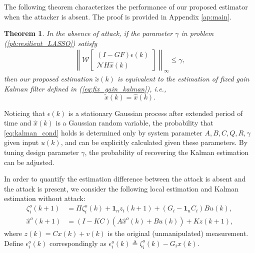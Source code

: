 \documentclass[12pt]{article}  %
\newcommand{\Nc}{{\mathcal{N}}}
\newcommand{\Wc}{{\mathcal{W}}}
\newcommand{\ift}{{\infty}}
\newtheorem{theorem}{\textbf{Theorem}}
\begin{document}
The following theorem characterizes the performance of our proposed estimator when the attacker is absent. 
The proof is provided in Appendix \ref{ap:main}.
\begin{theorem}\label{th:no_attack}
	In the absence of attack, if the parameter $\gamma$ in problem (\ref{pb:resilient_LASSO}) satisfy
	\begin{align}\label{eq:kalman_cond}
	\left\|\Wc \begin{bmatrix}
	\left(I-GF\right)\epsilon(k) \\
	\Nc H \hat{x}(k)
	\end{bmatrix}\right\|_\ift\leq\gamma, 
	\end{align}
	then our proposed estimation $\tilde{x}(k)$ is equivalent to the estimation of fixed gain Kalman filter defined in (\ref{eq:fix_gain_kalman}), i.e.,
	\begin{equation}\label{eq:eq_to_kalman}
	\tilde{x}(k)=\hat{x}(k).
	\end{equation}
\end{theorem}
Noticing that $\epsilon(k)$ is a stationary Gaussian process after extended period of time and $\hat{x}(k)$ is a Gaussian random variable, the probability that \eqref{eq:kalman_cond} holds is determined only by system parameter $A,B,C,Q,R,\gamma$ given input $u(k)$, and can be explicitly calculated given these parameters.
By tuning design parameter $\gamma$, the probability of recovering the Kalman estimation can be adjusted.

	

In order to quantify the estimation difference between the attack is absent and the attack is present, we consider the following local estimation and Kalman estimation without attack:
\begin{align}
\zeta^o_i (k+1) &= \Pi \zeta^o_i (k) + \mathbf{1}_n z_i (k+1) + (G_i-\mathbf{1}_nC_i)Bu(k), \label{eq:def_zetare} \\
\hat{x}^o (k+1)& = (I-K C) \left(A \hat{x}^o(k)+Bu(k)\right) + K z (k+1),\label{eq:def_xhatre}
\end{align}
where $z(k)=Cx(k)+v(k)$ is the original (unmanipulated) measurement.
Define $\epsilon^o_{i}(k)$ correspondingly as $\epsilon^o_{i}(k)\triangleq \zeta^o_i(k)-G_ix(k)$.
\end{document}
